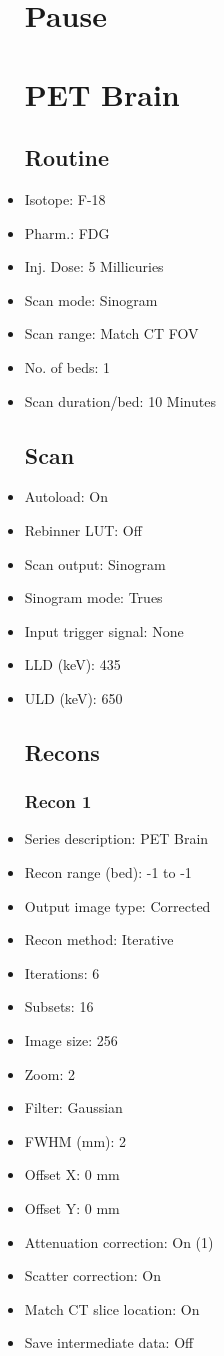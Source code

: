 \documentclass[12pt]{article}
\begin{document}
\begin{itemize}
\section{Pause}
\section{PET Brain}\subsection{Routine}
\item Isotope: F-18
\item Pharm.: FDG
\item Inj. Dose: 5 Millicuries
\item Scan mode: Sinogram
\item Scan range: Match CT FOV
\item No. of beds: 1
\item Scan duration/bed: 10 Minutes
\subsection{Scan}
\item Autoload: On
\item Rebinner LUT: Off
\item Scan output: Sinogram
\item Sinogram mode: Trues
\item Input trigger signal: None
\item LLD (keV): 435
\item ULD (keV): 650
\subsection{Recons}
\subsubsection{Recon 1}
\item Series description: PET Brain
\item Recon range (bed): -1 to -1
\item Output image type: Corrected
\item Recon method: Iterative
\item Iterations: 6
\item Subsets: 16
\item Image size: 256
\item Zoom: 2
\item Filter: Gaussian
\item FWHM (mm): 2
\item Offset X: 0 mm
\item Offset Y: 0 mm
\item Attenuation correction: On (1)
\item Scatter correction: On
\item Match CT slice location: On
\item Save intermediate data: Off
\end{itemize}
\end{document}
